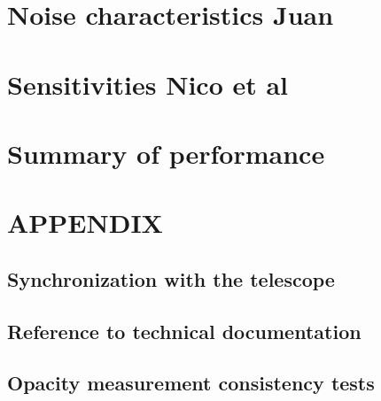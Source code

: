 \documentclass[a4paper, 11pt]{report}
\begin{document}
\chapter{Noise characteristics {\color{blue} Juan}}
\label{se:noise}



\clearpage
\chapter{Sensitivities {\color{blue} Nico et al} }
\label{se:nefd}





\clearpage
\chapter{Summary of performance}
\label{se:summary}



\clearpage
\appendix

\chapter{APPENDIX}

  \section{Synchronization with the telescope}
  \label{ap:synchro}
  
  
  \section{Reference to technical documentation}
  \label{ap:doc}
  

  \section{Opacity measurement consistency tests}
  \label{ap:opacity}
  
  \clearpage
  
\end{document}

